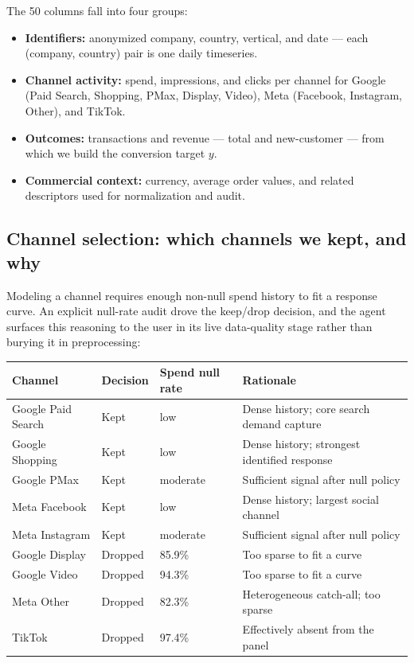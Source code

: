 \documentclass[11pt]{article}
\begin{document}
The 50 columns fall into four groups:

\begin{itemize}[nosep]
  \item \textbf{Identifiers:} anonymized company, country, vertical, and date --- each (company, country) pair is one daily timeseries.
  \item \textbf{Channel activity:} spend, impressions, and clicks per channel for Google (Paid Search, Shopping, PMax, Display, Video), Meta (Facebook, Instagram, Other), and TikTok.
  \item \textbf{Outcomes:} transactions and revenue --- total and new-customer --- from which we build the conversion target $y$.
  \item \textbf{Commercial context:} currency, average order values, and related descriptors used for normalization and audit.
\end{itemize}

\subsection{Channel selection: which channels we kept, and why}

Modeling a channel requires enough non-null spend history to fit a response curve. An explicit null-rate audit drove the keep/drop decision, and the agent surfaces this reasoning to the user in its live data-quality stage rather than burying it in preprocessing:

\begin{center}
\begin{tabular}{llll}
\toprule
\textbf{Channel} & \textbf{Decision} & \textbf{Spend null rate} & \textbf{Rationale} \\
\midrule
Google Paid Search & Kept & low & Dense history; core search demand capture \\
Google Shopping & Kept & low & Dense history; strongest identified response \\
Google PMax & Kept & moderate & Sufficient signal after null policy \\
Meta Facebook & Kept & low & Dense history; largest social channel \\
Meta Instagram & Kept & moderate & Sufficient signal after null policy \\
\midrule
Google Display & Dropped & 85.9\% & Too sparse to fit a curve \\
Google Video & Dropped & 94.3\% & Too sparse to fit a curve \\
Meta Other & Dropped & 82.3\% & Heterogeneous catch-all; too sparse \\
TikTok & Dropped & 97.4\% & Effectively absent from the panel \\
\bottomrule
\end{tabular}
\end{center}
\end{document}

